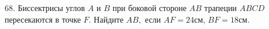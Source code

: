 68. Биссектрисы углов $A$ и $B$ при боковой стороне $AB$ трапеции $ABCD$ пересекаются в точке $F.$ Найдите $AB,$ если $AF=24$см, $BF=18$см.\\
